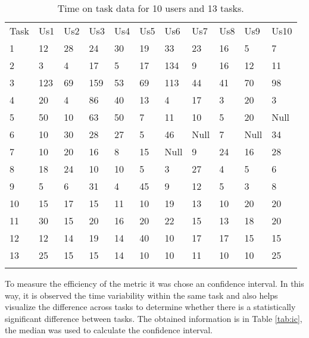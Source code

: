 \begin{table}
\centering
\caption{Time on task data for 10 users and 13 tasks. }
\label{tab:datausers}  
\begin{tabular}{lllllllllll}
\hline\noalign{\smallskip}
Task  & Us1  & Us2 & Us3 & Us4 & Us5 & Us6 & Us7 & Us8 & Us9 & Us10 \\
\noalign{\smallskip}\hline\noalign{\smallskip}
1 & 12  & 28 & 24 & 30 & 19 & 33  & 23 & 16 & 5  & 7 \\
2 & 3   & 4  & 17 & 5  & 17 & 134 & 9  & 16 & 12 & 11 \\
3 & 123 & 69 & 159& 53 & 69 & 113 & 44 & 41 & 70 & 98 \\
4 & 20  & 4  & 86 & 40 & 13 & 4   & 17 & 3  & 20 & 3 \\
5 & 50  & 10 & 63 & 50 & 7  & 11  & 10 & 5  & 20 & Null \\
6 & 10  & 30 & 28 & 27 & 5  & 46  & Null  & 7  & Null  & 34 \\
7 & 10  & 20 & 16 & 8  & 15 & Null   & 9  & 24 & 16 & 28 \\
8 & 18  & 24 & 10 & 10 & 5  & 3   & 27 & 4  & 5  & 6 \\
9 & 5   & 6  & 31 & 4  & 45 & 9   & 12 & 5  & 3  & 8 \\
10 & 15 & 17 & 15 & 11 & 10 & 19  & 13 & 10 & 20 & 20 \\
11 & 30 & 15 & 20 & 16 & 20 & 22  & 15 & 13 & 18 & 20 \\
12 & 12 & 14 & 19 & 14 & 40 & 10  & 17 & 17 & 15 & 15 \\
13 & 25 & 15 & 15 & 14 & 10 & 10  & 11 & 10 & 10 & 25 \\

\noalign{\smallskip}\hline
\end{tabular}
\end{table}

To measure the efficiency of the metric it was chose an confidence interval.  In
this way, it is observed the time variability within the same task and  also
helps visualize the difference across tasks to determine whether there is a
statistically significant difference between tasks. The obtained information is
in Table \ref{tab:ic}, the median was used to calculate the confidence interval.

